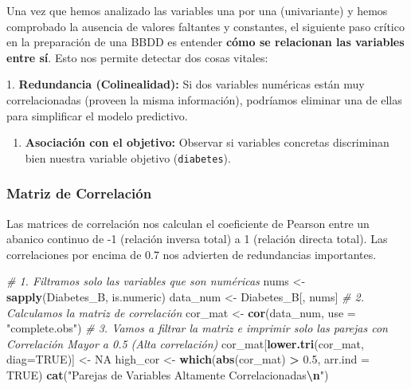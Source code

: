 \documentclass[
]{article}
\newenvironment{Shaded}{\begin{snugshade}}{\end{snugshade}}
\newcommand{\AttributeTok}[1]{\textcolor[rgb]{0.13,0.29,0.53}{#1}}
\newcommand{\CommentTok}[1]{\textcolor[rgb]{0.56,0.35,0.01}{\textit{#1}}}
\newcommand{\ConstantTok}[1]{\textcolor[rgb]{0.56,0.35,0.01}{#1}}
\newcommand{\FloatTok}[1]{\textcolor[rgb]{0.00,0.00,0.81}{#1}}
\newcommand{\FunctionTok}[1]{\textcolor[rgb]{0.13,0.29,0.53}{\textbf{#1}}}
\newcommand{\NormalTok}[1]{#1}
\newcommand{\OtherTok}[1]{\textcolor[rgb]{0.56,0.35,0.01}{#1}}
\newcommand{\SpecialCharTok}[1]{\textcolor[rgb]{0.81,0.36,0.00}{\textbf{#1}}}
\newcommand{\StringTok}[1]{\textcolor[rgb]{0.31,0.60,0.02}{#1}}
\providecommand{\tightlist}{%
  \setlength{\itemsep}{0pt}\setlength{\parskip}{0pt}}
\begin{document}
Una vez que hemos analizado las variables una por una (univariante) y
hemos comprobado la ausencia de valores faltantes y constantes, el
siguiente paso crítico en la preparación de una BBDD es entender
\textbf{cómo se relacionan las variables entre sí}. Esto nos permite
detectar dos cosas vitales:

1. \textbf{Redundancia (Colinealidad):} Si dos variables numéricas están
muy correlacionadas (proveen la misma información), podríamos eliminar
una de ellas para simplificar el modelo predictivo.

\begin{enumerate}
\def\labelenumi{\arabic{enumi}.}
\setcounter{enumi}{1}
\tightlist
\item
  \textbf{Asociación con el objetivo:} Observar si variables concretas
  discriminan bien nuestra variable objetivo (\texttt{diabetes}).
\end{enumerate}

\subsubsection{Matriz de Correlación}\label{matriz-de-correlaciuxf3n}

Las matrices de correlación nos calculan el coeficiente de Pearson entre
un abanico continuo de -1 (relación inversa total) a 1 (relación directa
total). Las correlaciones por encima de 0.7 nos advierten de
redundancias importantes.

\begin{Shaded}
\begin{Highlighting}[]
\CommentTok{\# 1. Filtramos solo las variables que son numéricas}
\NormalTok{nums }\OtherTok{\textless{}{-}} \FunctionTok{sapply}\NormalTok{(Diabetes\_B, is.numeric)}
\NormalTok{data\_num }\OtherTok{\textless{}{-}}\NormalTok{ Diabetes\_B[, nums]}
\CommentTok{\# 2. Calculamos la matriz de correlación}
\NormalTok{cor\_mat }\OtherTok{\textless{}{-}} \FunctionTok{cor}\NormalTok{(data\_num, }\AttributeTok{use =} \StringTok{"complete.obs"}\NormalTok{)}
\CommentTok{\# 3. Vamos a filtrar la matriz e imprimir solo las parejas con Correlación Mayor a 0.5 (Alta correlación)}
\NormalTok{cor\_mat[}\FunctionTok{lower.tri}\NormalTok{(cor\_mat, }\AttributeTok{diag=}\ConstantTok{TRUE}\NormalTok{)] }\OtherTok{\textless{}{-}} \ConstantTok{NA}
\NormalTok{high\_cor }\OtherTok{\textless{}{-}} \FunctionTok{which}\NormalTok{(}\FunctionTok{abs}\NormalTok{(cor\_mat) }\SpecialCharTok{\textgreater{}} \FloatTok{0.5}\NormalTok{, }\AttributeTok{arr.ind =} \ConstantTok{TRUE}\NormalTok{)}
\FunctionTok{cat}\NormalTok{(}\StringTok{"Parejas de Variables Altamente Correlacionadas}\SpecialCharTok{\textbackslash{}n}\StringTok{"}\NormalTok{)}
\end{Highlighting}
\end{Shaded}
\end{document}
